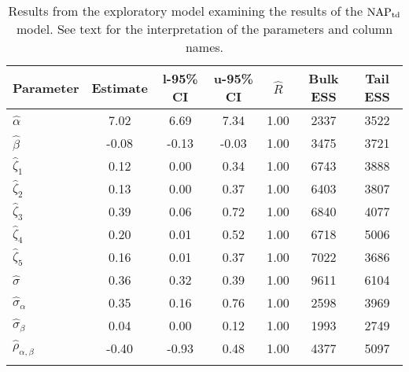 \begin{table}

\caption{Results from the exploratory model examining the results of the $\operatorname{NAP}_{\text{td}}$ model. \label{tab:the exploratory-NAPtd}See text for the interpretation of the parameters and column names.}

\begin{tabular}{l *3{S[table-format=-1.2]} S[table-format=1.2] *2{S[table-format=5.0]}}
\lsptoprule
Parameter & {Estimate} & {l-95\% CI} & {u-95\% CI} & {$\hat{R}$} & {Bulk ESS} & {Tail ESS}\\
\midrule
$\hat\alpha$ & 7.02 & 6.69 & 7.34 & 1.00 & 2337 & 3522\\
$\hat\beta$ & -0.08 & -0.13 & -0.03 & 1.00 & 3475 & 3721\\
$\hat\zeta_{1}$ & 0.12 & 0.00 & 0.34 & 1.00 & 6743 & 3888\\
$\hat\zeta_{2}$ & 0.13 & 0.00 & 0.37 & 1.00 & 6403 & 3807\\
$\hat\zeta_{3}$ & 0.39 & 0.06 & 0.72 & 1.00 & 6840 & 4077\\
$\hat\zeta_{4}$ & 0.20 & 0.01 & 0.52 & 1.00 & 6718 & 5006\\
$\hat\zeta_{5}$ & 0.16 & 0.01 & 0.37 & 1.00 & 7022 & 3686\\
$\hat\sigma$ & 0.36 & 0.32 & 0.39 & 1.00 & 9611 & 6104\\
$\hat\sigma_{\alpha}$ & 0.35 & 0.16 & 0.76 & 1.00 & 2598 & 3969\\
$\hat\sigma_{\beta}$ & 0.04 & 0.00 & 0.12 & 1.00 & 1993 & 2749\\
$\hat\rho_{\alpha,\beta}$ & -0.40 & -0.93 & 0.48 & 1.00 & 4377 & 5097\\
\lspbottomrule
\end{tabular}

\end{table}





